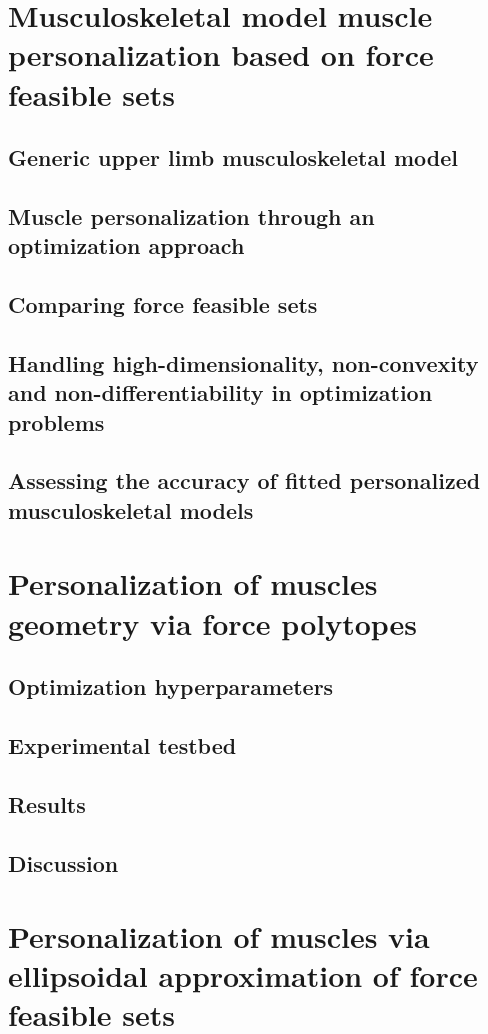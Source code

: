 
\section{Musculoskeletal model muscle personalization based on force feasible sets}
\subsection{Generic upper limb musculoskeletal model}
\subsection{Muscle personalization through an optimization approach}
\subsection{Comparing force feasible sets}
\subsection{Handling high-dimensionality, non-convexity and non-differentiability in optimization problems}
\subsection{Assessing the accuracy of fitted personalized musculoskeletal models}

\section{Personalization of muscles geometry via force polytopes}
\subsection{Optimization hyperparameters}
\subsection{Experimental testbed}
\subsection{Results}
\subsection{Discussion}

\section{Personalization of muscles via ellipsoidal approximation of force feasible sets}
